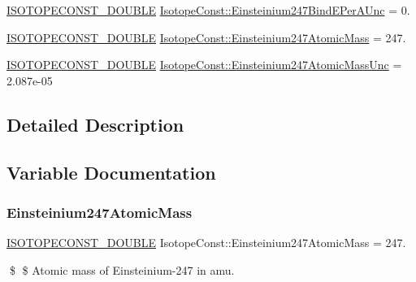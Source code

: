 \begin{DoxyCompactItemize}
\item 
\mbox{\hyperlink{group___isotope_const-_macros_ga8f45a7272ce02c0b4c65c44636ed719a}{I\+S\+O\+T\+O\+P\+E\+C\+O\+N\+S\+T\+\_\+\+D\+O\+U\+B\+LE}} \mbox{\hyperlink{group___isotope_const-_einsteinium-_es247_ga861a85ac9d861759d3f421f9d8f338ea}{Isotope\+Const\+::\+Einsteinium247\+Bind\+E\+Per\+A\+Unc}} = 0.
\item 
\mbox{\hyperlink{group___isotope_const-_macros_ga8f45a7272ce02c0b4c65c44636ed719a}{I\+S\+O\+T\+O\+P\+E\+C\+O\+N\+S\+T\+\_\+\+D\+O\+U\+B\+LE}} \mbox{\hyperlink{group___isotope_const-_einsteinium-_es247_gafec6130c89b1737754693fead229777b}{Isotope\+Const\+::\+Einsteinium247\+Atomic\+Mass}} = 247.
\item 
\mbox{\hyperlink{group___isotope_const-_macros_ga8f45a7272ce02c0b4c65c44636ed719a}{I\+S\+O\+T\+O\+P\+E\+C\+O\+N\+S\+T\+\_\+\+D\+O\+U\+B\+LE}} \mbox{\hyperlink{group___isotope_const-_einsteinium-_es247_gaeec690e7715f37e709eb5cec30b1cca4}{Isotope\+Const\+::\+Einsteinium247\+Atomic\+Mass\+Unc}} = 2.\+087e-\/05
\end{DoxyCompactItemize}


\subsection{Detailed Description}


\subsection{Variable Documentation}
\mbox{\label{group___isotope_const-_einsteinium-_es247_gafec6130c89b1737754693fead229777b}} 
\subsubsection{\texorpdfstring{Einsteinium247\+Atomic\+Mass}{Einsteinium247AtomicMass}}
{\footnotesize\ttfamily \mbox{\hyperlink{group___isotope_const-_macros_ga8f45a7272ce02c0b4c65c44636ed719a}{I\+S\+O\+T\+O\+P\+E\+C\+O\+N\+S\+T\+\_\+\+D\+O\+U\+B\+LE}} Isotope\+Const\+::\+Einsteinium247\+Atomic\+Mass = 247.}

\$ \$ Atomic mass of Einsteinium-\/247 in amu. \mbox{\label{group___isotope_const-_einsteinium-_es247_gaeec690e7715f37e709eb5cec30b1cca4}} 
